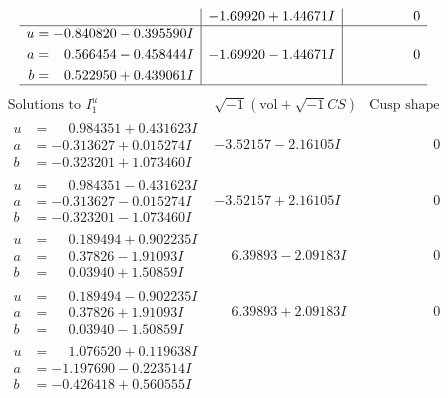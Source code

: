 \documentclass[1p]{elsarticle_modified}
\theoremstyle{definition}
\newcommand{\I}{\sqrt{-1}}
\begin{document}
$$\begin{array}{c|c|c}
 & -1.69920 + 1.44671 I & \phantom{-0.000000 } 0 \\ \hline\begin{aligned}
u &= -0.840820 - 0.395590 I \\
a &= \phantom{-}0.566454 - 0.458444 I \\
b &= \phantom{-}0.522950 + 0.439061 I\end{aligned}
 & -1.69920 - 1.44671 I & \phantom{-0.000000 } 0\\
 \hline 
 \end{array}$$\newpage$$\begin{array}{c|c|c}  
\text{Solutions to }I^u_{1}& \I (\text{vol} + \sqrt{-1}CS) & \text{Cusp shape}\\
 \hline 
\begin{aligned}
u &= \phantom{-}0.984351 + 0.431623 I \\
a &= -0.313627 + 0.015274 I \\
b &= -0.323201 + 1.073460 I\end{aligned}
 & -3.52157 - 2.16105 I & \phantom{-0.000000 } 0 \\ \hline\begin{aligned}
u &= \phantom{-}0.984351 - 0.431623 I \\
a &= -0.313627 - 0.015274 I \\
b &= -0.323201 - 1.073460 I\end{aligned}
 & -3.52157 + 2.16105 I & \phantom{-0.000000 } 0 \\ \hline\begin{aligned}
u &= \phantom{-}0.189494 + 0.902235 I \\
a &= \phantom{-}0.37826 - 1.91093 I \\
b &= \phantom{-}0.03940 + 1.50859 I\end{aligned}
 & \phantom{-}6.39893 - 2.09183 I & \phantom{-0.000000 } 0 \\ \hline\begin{aligned}
u &= \phantom{-}0.189494 - 0.902235 I \\
a &= \phantom{-}0.37826 + 1.91093 I \\
b &= \phantom{-}0.03940 - 1.50859 I\end{aligned}
 & \phantom{-}6.39893 + 2.09183 I & \phantom{-0.000000 } 0 \\ \hline\begin{aligned}
u &= \phantom{-}1.076520 + 0.119638 I \\
a &= -1.197690 - 0.223514 I \\
b &= -0.426418 + 0.560555 I\end{aligned}

\end{array}$$
\end{document}
